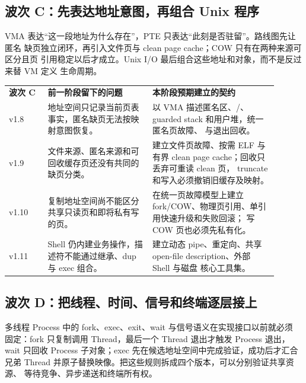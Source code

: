 \subsection*{波次 C：先表达地址意图，再组合 Unix 程序}

VMA 表达“这一段地址为什么存在”，PTE 只表达“此刻是否驻留”。路线图先让匿名
缺页独立闭环，再引入文件页与 clean page cache；COW 只有在两种来源可区分且页
引用稳定以后才成立。Unix I/O 最后组合这些地址和对象，而不是反过来替 VM 定义
生命周期。

\begin{longtable}{|L{0.13\linewidth}|L{0.35\linewidth}|L{0.42\linewidth}|}
\hline
{}
\textbf{波次 C} & \textbf{前一阶段留下的问题} & \textbf{本阶段预期建立的契约} \\\tablerowrule
\endhead
v1.8 & 地址空间只记录当前页表事实，匿名缺页无法按映射意图恢复。 &
以 VMA 描述匿名区、/、guarded stack 和用户堆，统一
匿名页故障、 与退出回收。 \\\tablerowrule
v1.9 & 文件来源、匿名来源和可回收缓存页还没有共同的缺页分类。 &
建立文件页故障、按需 ELF 与有界 clean page cache；回收只丢弃可重读 clean 页，
truncate 和写入必须撤销旧缓存及映射。 \\\tablerowrule
v1.10 & 复制地址空间尚不能区分共享只读页和即将私有写的页。 &
在统一页故障模型上建立 fork/COW、物理页引用、单引用快速升级和失败回滚；
 写 COW 页也必须先私有化。 \\\tablerowrule
v1.11 & Shell 仍内建业务操作，描述符不能通过继承、dup 与 exec 组合。 &
建立动态 pipe、重定向、共享 open-file description、外部 Shell 与磁盘
 核心工具集。 \\\hline
\end{longtable}

\subsection*{波次 D：把线程、时间、信号和终端逐层接上}

多线程 Process 中的 fork、exec、exit、wait 与信号语义在实现接口以前就必须
固定：fork 只复制调用 Thread，最后一个 Thread 退出才触发 Process 退出，
wait 只回收 Process 子对象；exec 先在候选地址空间中完成验证，成功后才汇合
兄弟 Thread 并原子替换映像。把这些规则拆成四个版本，可以分别验证共享资源、
等待竞争、异步递送和终端所有权。

